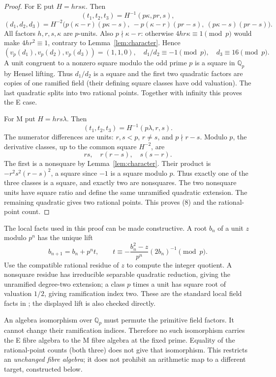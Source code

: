 \begin{proof}
For E put $H=hrs\kappa$. Then
\[
 (t_1,t_2,t_3)=H^{-1}(p\kappa,pr,s),
\]
\[
 (d_1,d_2,d_3)=H^{-2}\bigl(
 p(\kappa-r)(p\kappa-s),\
 -p(\kappa-r)(pr-s),\
 (p\kappa-s)(pr-s)\bigr).                              \tag{9}
\]
All factors $h,r,s,\kappa$ are $p$-units. Also $p\nmid\kappa-r$: otherwise
$4hr\kappa\equiv1\pmod p$ would make $4hr^2\equiv1$, contrary to
Lemma~\ref{lem:character}. Hence
\[
 (v_p(d_1),v_p(d_2),v_p(d_3))=(1,1,0),\quad
 d_1/d_2\equiv-1\pmod p,\quad d_3\equiv16\pmod p.       \tag{10}
\]
A unit congruent to a nonzero square modulo the odd prime $p$ is a square in
$\mathbb Q_p$ by Hensel lifting. Thus $d_1/d_2$ is a square and the first
two quadratic factors are copies of one ramified field (their defining
square classes have odd valuation). The last quadratic splits into two
rational points. Together with infinity this proves the E case.

For M put $H=hrs\lambda$. Then
\[
 (t_1,t_2,t_3)=H^{-1}(p\lambda,r,s).
\]
The numerator differences are units: $r,s<p$, $r\ne s$, and $p\nmid r-s$.
Modulo $p$, the derivative classes, up to the common square $H^{-2}$, are
\[
 \boxed{rs,\quad r(r-s),\quad s(s-r).}                  \tag{11}
\]
The first is a nonsquare by Lemma~\ref{lem:character}. Their product is
$-r^2s^2(r-s)^2$, a square since $-1$ is a square modulo $p$. Thus exactly
one of the three classes is a square, and exactly two are nonsquares.
The two nonsquare units have square ratio and define the same unramified
quadratic extension. The remaining quadratic gives two rational points.
This proves (8) and the rational-point count.
\end{proof}

The local facts used in this proof can be made constructive. A root $b_n$
of a unit $z$ modulo $p^n$ has the unique lift
\[
 b_{n+1}=b_n+p^n t,\qquad
 t\equiv-\frac{b_n^2-z}{p^n}(2b_n)^{-1}\pmod p.
\]
Use the compatible rational residue of $z$ to compute the integer quotient.
A nonsquare residue has irreducible separable quadratic reduction, giving the
unramified degree-two extension; a class $p$ times a unit has square root of
valuation $1/2$, giving ramification index two. These are the standard local
field facts in \cite{Milne}; the displayed lift is also checked directly.

An algebra isomorphism over $\mathbb Q_p$ must permute the primitive field
factors. It cannot change their ramification indices. Therefore no such
isomorphism carries the E fibre algebra to the M fibre algebra at the fixed
prime. Equality of the rational-point counts (both three) does not give that
isomorphism. This restricts an \emph{unchanged fibre algebra}; it does not
prohibit an arithmetic map to a different target, constructed below.

